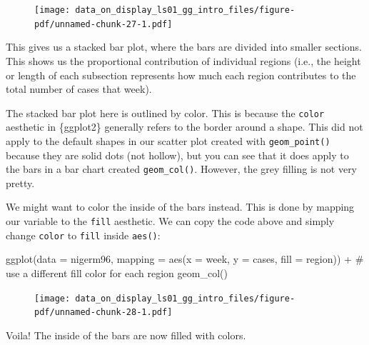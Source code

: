 \documentclass[
  letterpaper,
  DIV=11,
  numbers=noendperiod]{scrreprt}
\newenvironment{Shaded}{\begin{snugshade}}{\end{snugshade}}
\newcommand{\AttributeTok}[1]{\textcolor[rgb]{0.40,0.45,0.13}{#1}}
\newcommand{\CommentTok}[1]{\textcolor[rgb]{0.37,0.37,0.37}{#1}}
\newcommand{\FunctionTok}[1]{\textcolor[rgb]{0.28,0.35,0.67}{#1}}
\newcommand{\NormalTok}[1]{\textcolor[rgb]{0.00,0.23,0.31}{#1}}
\newcommand{\SpecialCharTok}[1]{\textcolor[rgb]{0.37,0.37,0.37}{#1}}
\begin{document}
\begin{figure}[H]

{\centering \texttt{[image: data\_on\_display\_ls01\_gg\_intro\_files/figure-pdf/unnamed-chunk-27-1.pdf]}

}

\end{figure}

This gives us a stacked bar plot, where the bars are divided into
smaller sections. This shows us the proportional contribution of
individual regions (i.e., the height or length of each subsection
represents how much each region contributes to the total number of cases
that week).

The stacked bar plot here is outlined by color. This is because the
\texttt{color} aesthetic in \{ggplot2\} generally refers to the border
around a shape. This did not apply to the default shapes in our scatter
plot created with \texttt{geom\_point()} because they are solid dots
(not hollow), but you can see that it does apply to the bars in a bar
chart created \texttt{geom\_col()}. However, the grey filling is not
very pretty.

We might want to color the inside of the bars instead. This is done by
mapping our variable to the \texttt{fill} aesthetic. We can copy the
code above and simply change \texttt{color} to \texttt{fill} inside
\texttt{aes()}:

\begin{Shaded}
\begin{Highlighting}[]
\FunctionTok{ggplot}\NormalTok{(}\AttributeTok{data =}\NormalTok{ nigerm96, }
       \AttributeTok{mapping =} \FunctionTok{aes}\NormalTok{(}\AttributeTok{x =}\NormalTok{ week, }
                     \AttributeTok{y =}\NormalTok{ cases, }
                     \AttributeTok{fill =}\NormalTok{ region)) }\SpecialCharTok{+}  \CommentTok{\# use a different fill color for each region}
  \FunctionTok{geom\_col}\NormalTok{()}
\end{Highlighting}
\end{Shaded}

\begin{figure}[H]

{\centering \texttt{[image: data\_on\_display\_ls01\_gg\_intro\_files/figure-pdf/unnamed-chunk-28-1.pdf]}

}

\end{figure}

Voila! The inside of the bars are now filled with colors.
\end{document}
